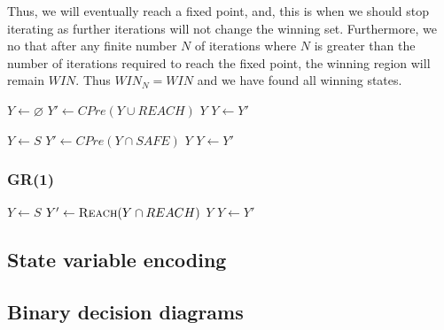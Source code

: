 \documentclass{article}
\newcommand{\buchi}{Buchi }
\begin{document}
Thus, we will eventually reach a fixed point, and, this is when we should stop iterating as further iterations will not change the winning set. Furthermore, we no that after any finite number $N$ of iterations where $N$ is greater than the number of iterations required to reach the fixed point, the winning region will remain $WIN$. Thus $WIN_N = WIN$ and we have found all winning states.

\begin{algorithm}[t]
\begin{algorithmic}
\State $Y \gets \varnothing$
\Loop
\State $Y' \gets CPre(Y \cup REACH)$
\State\Return $Y$\EndIf
\State $Y \gets Y'$
\EndLoop
\EndFunction
\end{algorithmic}
\caption{Solving a reachability game}
\label{a:reach}
\end{algorithm}

\begin{algorithm}[t]
\begin{algorithmic}
\State $Y \gets S$
\Loop
\State $Y' \gets CPre(Y \cap SAFE)$
\State\Return $Y$\EndIf
\State $Y \gets Y'$
\EndLoop
\EndFunction
\end{algorithmic}
\caption{Solving a safety game}
\label{a:safe}
\end{algorithm}

\subsubsection{GR(1)}

\begin{algorithm}[t]
\begin{algorithmic}
\State $Y \gets S$
\Loop
\State $Y' \gets \Call{Reach}{Y \cap REACH}$
\State\Return $Y$\EndIf
\State $Y \gets Y'$
\EndLoop
\EndFunction
\end{algorithmic}
\caption{Solving a \buchi game}
\label{a:buchi}
\end{algorithm}

\subsection{State variable encoding}

\subsection{Binary decision diagrams}
\end{document}
